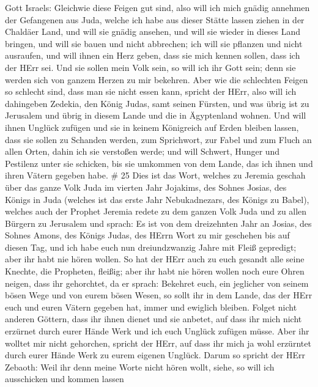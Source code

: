 Gott Israels: Gleichwie diese Feigen gut sind, also will ich mich gnädig
annehmen der Gefangenen aus Juda, welche ich habe aus dieser Stätte
lassen ziehen in der Chaldäer Land,  und will sie gnädig
ansehen, und will sie wieder in dieses Land bringen, und will sie bauen
und nicht abbrechen; ich will sie pflanzen und nicht ausraufen,
 und will ihnen ein Herz geben, dass sie mich kennen sollen,
dass ich der HErr sei. Und sie sollen mein Volk sein, so will ich ihr
Gott sein; denn sie werden sich von ganzem Herzen zu mir bekehren.
 Aber wie die schlechten Feigen so schlecht sind, dass man
sie nicht essen kann, spricht der HErr, also will ich dahingeben
Zedekia, den König Judas, samt seinen Fürsten, und was übrig ist zu
Jerusalem und übrig in diesem Lande und die in Ägyptenland wohnen.
 Und will ihnen Unglück zufügen und sie in keinem Königreich
auf Erden bleiben lassen, dass sie sollen zu Schanden werden, zum
Sprichwort, zur Fabel und zum Fluch an allen Orten, dahin ich sie
verstoßen werde;  und will Schwert, Hunger und Pestilenz
unter sie schicken, bis sie umkommen von dem Lande, das ich ihnen und
ihren Vätern gegeben habe. \# 25  Dies ist das Wort, welches
zu Jeremia geschah über das ganze Volk Juda im vierten Jahr Jojakims,
des Sohnes Josias, des Königs in Juda (welches ist das erste Jahr
Nebukadnezars, des Königs zu Babel),  welches auch der
Prophet Jeremia redete zu dem ganzen Volk Juda und zu allen Bürgern zu
Jerusalem und sprach:  Es ist von dem dreizehnten Jahr an
Josias, des Sohnes Amons, des Königs Judas, des HErrn Wort zu mir
geschehen bis auf diesen Tag, und ich habe euch nun dreiundzwanzig Jahre
mit Fleiß gepredigt; aber ihr habt nie hören wollen.  So hat
der HErr auch zu euch gesandt alle seine Knechte, die Propheten,
fleißig; aber ihr habt nie hören wollen noch eure Ohren neigen, dass ihr
gehorchtet,  da er sprach: Bekehret euch, ein jeglicher von
seinem bösen Wege und von eurem bösen Wesen, so sollt ihr in dem Lande,
das der HErr euch und euren Vätern gegeben hat, immer und ewiglich
bleiben.  Folget nicht anderen Göttern, dass ihr ihnen
dienet und sie anbetet, auf dass ihr mich nicht erzürnet durch eurer
Hände Werk und ich euch Unglück zufügen müsse.  Aber ihr
wolltet mir nicht gehorchen, spricht der HErr, auf dass ihr mich ja wohl
erzürntet durch eurer Hände Werk zu eurem eigenen Unglück. 
Darum so spricht der HErr Zebaoth: Weil ihr denn meine Worte nicht hören
wollt,  siehe, so will ich ausschicken und kommen lassen
